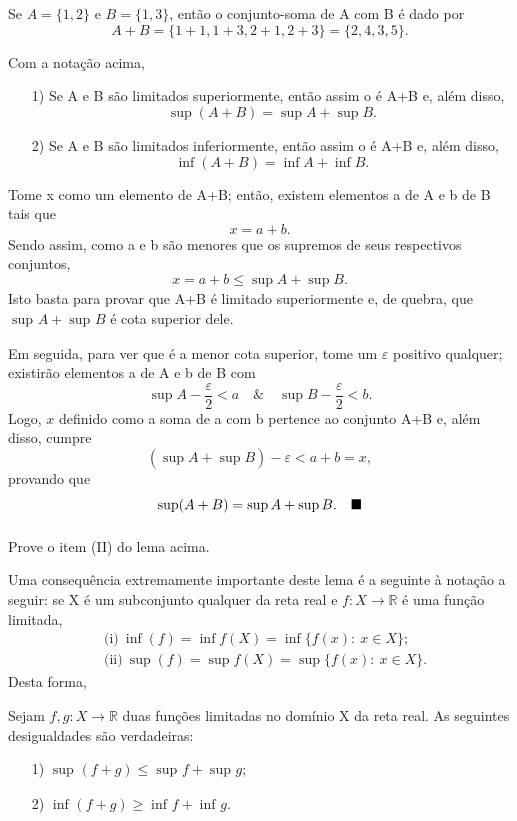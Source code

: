 \documentclass[../analysisII_notes.tex]{subfiles}
\begin{document}
\begin{example}
	Se \(A=\{1, 2\}\) e \(B=\{1, 3\}\), então o conjunto-soma de A com B é dado por
	\[
		A+B=\{1+1,1+3,2+1,2+3\}=\{2,4,3,5\}.
	\]
\end{example}
\begin{lemma*}
	Com a notação acima,
	\begin{itemize}
		\item[1)] Se A e B são limitados superiormente, então assim o é A+B e, além disso,
		      \[
			      \sup_{}(A+B)=\sup_{}A + \sup_{}B.
		      \]
		\item[2)] Se A e B são limitados inferiormente, então assim o é A+B e, além disso,
		      \[
			      \inf_{}(A+B)=\inf_{}A + \inf_{}B.
		      \]
	\end{itemize}
\end{lemma*}
\begin{proof*}
	Tome x como um elemento de A+B; então, existem elementos a de A e b de B tais que
	\[
		x=a+b.
	\]
	Sendo assim, como a e b são menores que os supremos de seus respectivos conjuntos,
	\[
		x = a+b \leq \sup_{}A + \sup_{}B.
	\]
	Isto basta para provar que A+B é limitado superiormente e, de quebra, que \(\sup_{}A+\sup_{}B\) é cota superior dele.

	Em seguida, para ver que é a menor cota superior, tome um \(\varepsilon \) positivo qualquer; existirão elementos a de A e b de B com
	\[
		\sup_{}A - \frac{\varepsilon }{2}<a \quad\&\quad \sup_{}B-\frac{\varepsilon }{2}<b.
	\]
	Logo, \(x\) definido como a soma de a com b pertence ao conjunto A+B e, além disso, cumpre
	\[
		(\sup_{}A+\sup_{}B)-\varepsilon <a+b = x,
	\]
	provando que
	\[
		\sup_{}(A+B)=\sup_{}A+\sup_{}B.\quad \text{$\blacksquare$}
	\]
\end{proof*}
\begin{exr}
	Prove o item (II) do lema acima.
\end{exr}
Uma consequência extremamente importante deste lema é a seguinte à notação a seguir: se X é um subconjunto qualquer da reta real e \(f:X\rightarrow \mathbb{R}\) é uma função limitada,
\begin{align*}
	 & \text{(i)} \: \inf_{}(f)=\inf_{}f(X)=\inf_{}\{f(x):\:x\in X\};  \\
	 & \text{(ii)} \: \sup_{}(f)=\sup_{}f(X)=\sup_{}\{f(x):\:x\in X\}.
\end{align*}
Desta forma,
\begin{crl*}
	Sejam \(f, g:X\rightarrow \mathbb{R}\) duas funções limitadas no domínio X da reta real. As seguintes desigualdades são verdadeiras:
	\begin{itemize}
		\item[1)] \(\sup_{}(f+g)\leq \sup_{}f+\sup_{}g\);
		\item[2)] \(\inf_{}(f+g)\geq \inf_{}f + \inf_{}g\).
	\end{itemize}
\end{crl*}
\end{document}
